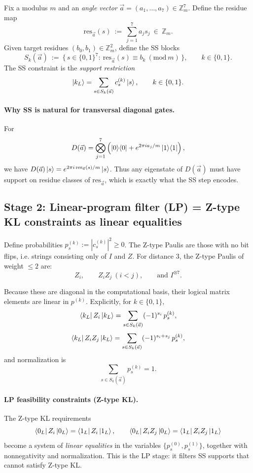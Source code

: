 \documentclass[11pt]{article}
\begin{document}
Fix a modulus \(m\) and an \emph{angle vector} \(\vec a=(a_1,\dots,a_7)\in \mathbb{Z}_m^7\).
Define the residue map
\[
\mathrm{res}_{\vec a}(s)\ :=\ \sum_{j=1}^7 a_j s_j\ \in\ \mathbb{Z}_m.
\]
Given target residues \((b_0,b_1)\in\mathbb{Z}_m^2\), define the SS blocks
\[
S_k(\vec a)\ :=\ \{\,s\in\{0,1\}^7:\ \mathrm{res}_{\vec a}(s)\equiv b_k \ (\mathrm{mod}\ m)\,\},
\qquad k\in\{0,1\}.
\]
The SS constraint is the \emph{support restriction}
\[
\ket{k_L}=\sum_{s\in S_k(\vec a)} c^{(k)}_s \ket{s},
\qquad k\in\{0,1\}.
\]

\paragraph{Why SS is natural for transversal diagonal gates.}
For
\[
D(\vec a)=\bigotimes_{j=1}^7\left(\ket{0}\!\bra{0}+e^{2\pi i a_j/m}\ket{1}\!\bra{1}\right),
\]
we have \(D(\vec a)\ket{s}=e^{2\pi i\,\mathrm{res}_{\vec a}(s)/m}\ket{s}\).
Thus any eigenstate of \(D(\vec a)\) must have support on residue classes of \(\mathrm{res}_{\vec a}\),
which is exactly what the SS step encodes.

\subsection{Stage 2: Linear-program filter (LP) = Z-type KL constraints as linear equalities}

Define probabilities \(p^{(k)}_s:=|c^{(k)}_s|^2\ge 0\).
The Z-type Paulis are those with no bit flips, i.e. strings consisting only of \(I\) and \(Z\).
For distance \(3\), the Z-type Paulis of weight \(\le 2\) are:
\[
Z_i,\qquad Z_iZ_j\ (i<j),\qquad \text{and }I^{\otimes 7}.
\]

Because these are diagonal in the computational basis, their logical matrix elements are linear in \(p^{(k)}\).
Explicitly, for \(k\in\{0,1\}\),
\[
\bra{k_L}Z_i\ket{k_L}=\sum_{s\in S_k(\vec a)} (-1)^{s_i}\,p^{(k)}_s,
\]
\[
\bra{k_L}Z_iZ_j\ket{k_L}=\sum_{s\in S_k(\vec a)} (-1)^{s_i+s_j}\,p^{(k)}_s,
\]
and normalization is
\[
\sum_{s\in S_k(\vec a)} p^{(k)}_s = 1.
\]

\paragraph{LP feasibility constraints (Z-type KL).}
The Z-type KL requirements
\[
\bra{0_L}Z_i\ket{0_L}=\bra{1_L}Z_i\ket{1_L},\qquad
\bra{0_L}Z_iZ_j\ket{0_L}=\bra{1_L}Z_iZ_j\ket{1_L}
\]
become a system of \emph{linear equalities} in the variables \(\{p^{(0)}_s,p^{(1)}_s\}\),
together with nonnegativity and normalization.
This is the LP stage: it filters SS supports that cannot satisfy Z-type KL.
\end{document}
